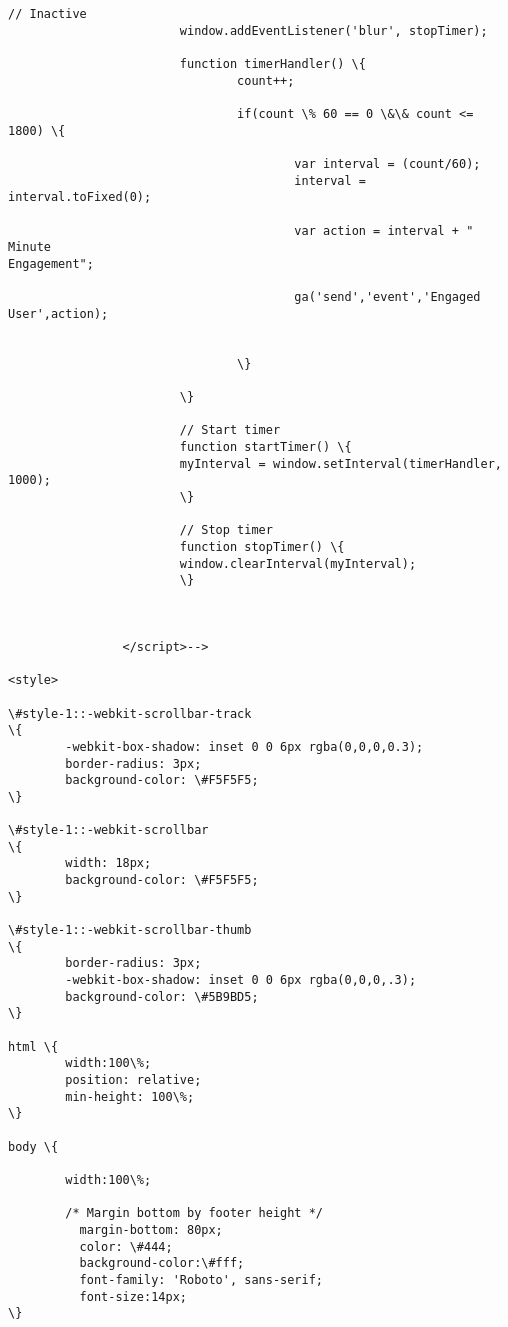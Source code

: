 \documentclass[11pt]{article}
\begin{document}
\begin{Verbatim}[commandchars=\\\{\}]
                        // Inactive
                        window.addEventListener('blur', stopTimer);

                        function timerHandler() \{
                                count++;

                                if(count \% 60 == 0 \&\& count <= 1800) \{

                                        var interval = (count/60);
                                        interval = interval.toFixed(0);

                                        var action = interval + " Minute
Engagement";

                                        ga('send','event','Engaged
User',action);


                                \}

                        \}

                        // Start timer
                        function startTimer() \{
                        myInterval = window.setInterval(timerHandler, 1000);
                        \}

                        // Stop timer
                        function stopTimer() \{
                        window.clearInterval(myInterval);
                        \}



                </script>-->

<style>

\#style-1::-webkit-scrollbar-track
\{
        -webkit-box-shadow: inset 0 0 6px rgba(0,0,0,0.3);
        border-radius: 3px;
        background-color: \#F5F5F5;
\}

\#style-1::-webkit-scrollbar
\{
        width: 18px;
        background-color: \#F5F5F5;
\}

\#style-1::-webkit-scrollbar-thumb
\{
        border-radius: 3px;
        -webkit-box-shadow: inset 0 0 6px rgba(0,0,0,.3);
        background-color: \#5B9BD5;
\}

html \{
        width:100\%;
        position: relative;
        min-height: 100\%;
\}

body \{

        width:100\%;

        /* Margin bottom by footer height */
          margin-bottom: 80px;
          color: \#444;
          background-color:\#fff;
          font-family: 'Roboto', sans-serif;
          font-size:14px;
\}






\end{Verbatim}
\end{document}
